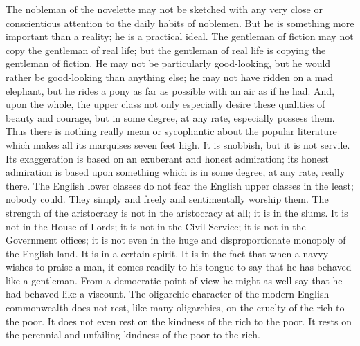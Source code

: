The nobleman of the novelette may not be sketched with any very close or conscientious attention to the daily habits of noblemen. But he is something more important than a reality; he is a practical ideal. The gentleman of fiction may not copy the gentleman of real life; but the gentleman of real life is copying the gentleman of fiction. He may not be particularly good-looking, but he would rather be good-looking than anything else; he may not have ridden on a mad elephant, but he rides a pony as far as possible with an air as if he had. And, upon the whole, the upper class not only especially desire these qualities of beauty and courage, but in some degree, at any rate, especially possess them. Thus there is nothing really mean or sycophantic about the popular literature which makes all its marquises seven feet high. It is snobbish, but it is not servile. Its exaggeration is based on an exuberant and honest admiration; its honest admiration is based upon something which is in some degree, at any rate, really there. The English lower classes do not fear the English upper classes in the least; nobody could. They simply and freely and sentimentally worship them. The strength of the aristocracy is not in the aristocracy at all; it is in the slums. It is not in the House of Lords; it is not in the Civil Service; it is not in the Government offices; it is not even in the huge and disproportionate monopoly of the English land. It is in a certain spirit. It is in the fact that when a navvy wishes to praise a man, it comes readily to his tongue to say that he has behaved like a gentleman. From a democratic point of view he might as well say that he had behaved like a viscount. The oligarchic character of the modern English commonwealth does not rest, like many oligarchies, on the cruelty of the rich to the poor. It does not even rest on the kindness of the rich to the poor. It rests on the perennial and unfailing kindness of the poor to the rich.

